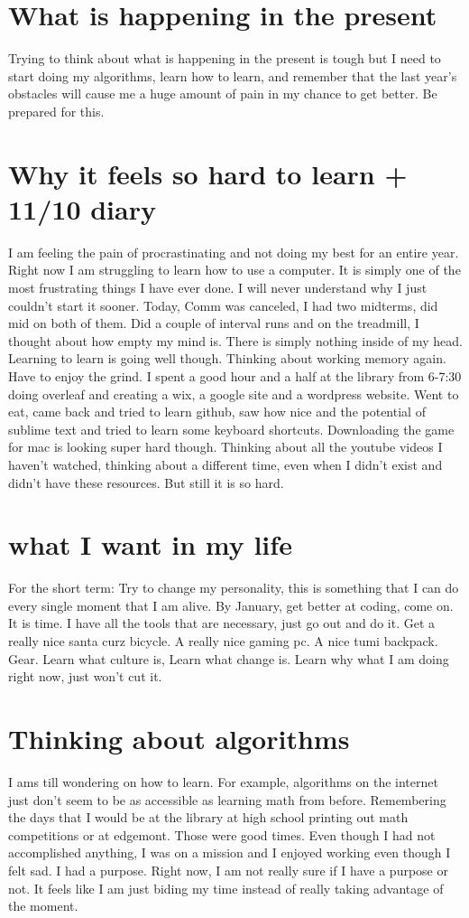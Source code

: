 \documentclass[12pt]{article}
\begin{document}
\section{What is happening in the present}
Trying to think about what is happening in the present is tough but I need to start doing my algorithms, learn how to learn, and remember that the last year's obstacles will cause me a huge amount of pain in my chance to get better. Be prepared for this.
\section{Why it feels so hard to learn + 11/10 diary}
I am feeling the pain of procrastinating and not doing my best for an entire year. Right now I am struggling to learn how to use a computer. It is simply one of the most frustrating things I have ever done. I will never understand why I just couldn't start it sooner. Today, Comm was canceled, I had two midterms, did mid on both of them. Did a couple of interval runs and on the treadmill, I thought about how empty my mind is. There is simply nothing inside of my head. Learning to learn is going well though. Thinking about working memory again. Have to enjoy the grind. I spent a good hour and a half at the library from 6-7:30 doing overleaf and creating a wix, a google site and a wordpress website. Went to eat, came back and tried to learn github, saw how nice and the potential of sublime text and tried to learn some keyboard shortcuts. Downloading the game for mac is looking super hard though. Thinking about all the youtube videos I haven't watched, thinking about a different time, even when I didn't exist and didn't have these resources. But still it is so hard. 
\section{what I want in my life}
For the short term: Try to change my personality, this is something that I can do every single moment that I am alive. By January, get better at coding, come on. It is time. I have all the tools that are necessary, just go out and do it. Get a really nice santa curz bicycle. A really nice gaming pc. A nice tumi backpack. Gear. Learn what culture is, Learn what change is. Learn why what I am doing right now, just won't cut it.
\section{Thinking about algorithms}
I ams till wondering on how to learn. For example, algorithms on the internet just don't seem to be as accessible as learning math from before. Remembering the days that I would be at the library at high school printing out math competitions or at edgemont. Those were good times. Even though I had not accomplished anything, I was on a mission and I enjoyed working even though I felt sad. I had a purpose. Right now, I am not really sure if I have a purpose or not. It feels like I am just biding my time instead of really taking advantage of the moment.
\end{document}

